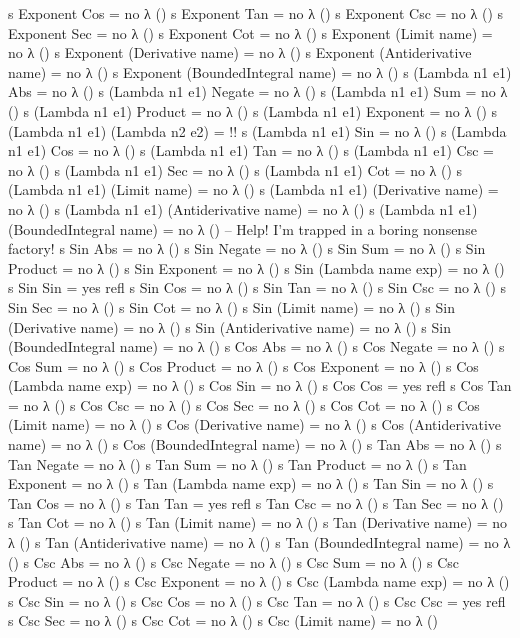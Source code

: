 \documentclass{report}
\begin{document}
\begin{code}
  s Exponent Cos = no λ ()
  s Exponent Tan = no λ ()
  s Exponent Csc = no λ ()
  s Exponent Sec = no λ ()
  s Exponent Cot = no λ ()
  s Exponent (Limit name) = no λ ()
  s Exponent (Derivative name) = no λ ()
  s Exponent (Antiderivative name) = no λ ()
  s Exponent (BoundedIntegral name) = no λ ()
  s (Lambda n1 e1) Abs = no λ ()
  s (Lambda n1 e1) Negate = no λ ()
  s (Lambda n1 e1) Sum = no λ ()
  s (Lambda n1 e1) Product = no λ ()
  s (Lambda n1 e1) Exponent = no λ ()
  s (Lambda n1 e1) (Lambda n2 e2) = {!!}
  s (Lambda n1 e1) Sin = no λ ()
  s (Lambda n1 e1) Cos = no λ ()
  s (Lambda n1 e1) Tan = no λ ()
  s (Lambda n1 e1) Csc = no λ ()
  s (Lambda n1 e1) Sec = no λ ()
  s (Lambda n1 e1) Cot = no λ ()
  s (Lambda n1 e1) (Limit name) = no λ ()
  s (Lambda n1 e1) (Derivative name) = no λ ()
  s (Lambda n1 e1) (Antiderivative name) = no λ ()
  s (Lambda n1 e1) (BoundedIntegral name) = no λ ()
  -- Help!  I'm trapped in a boring nonsense factory!
  s Sin Abs = no λ ()
  s Sin Negate = no λ ()
  s Sin Sum = no λ ()
  s Sin Product = no λ ()
  s Sin Exponent = no λ ()
  s Sin (Lambda name exp) = no λ ()
  s Sin Sin = yes refl
  s Sin Cos = no λ ()
  s Sin Tan = no λ ()
  s Sin Csc = no λ ()
  s Sin Sec = no λ ()
  s Sin Cot = no λ ()
  s Sin (Limit name) = no λ ()
  s Sin (Derivative name) = no λ ()
  s Sin (Antiderivative name) = no λ ()
  s Sin (BoundedIntegral name) = no λ ()
  s Cos Abs = no λ ()
  s Cos Negate = no λ ()
  s Cos Sum = no λ ()
  s Cos Product = no λ ()
  s Cos Exponent = no λ ()
  s Cos (Lambda name exp) = no λ ()
  s Cos Sin = no λ ()
  s Cos Cos = yes refl
  s Cos Tan = no λ ()
  s Cos Csc = no λ ()
  s Cos Sec = no λ ()
  s Cos Cot = no λ ()
  s Cos (Limit name) = no λ ()
  s Cos (Derivative name) = no λ ()
  s Cos (Antiderivative name) = no λ ()
  s Cos (BoundedIntegral name) = no λ ()
  s Tan Abs = no λ ()
  s Tan Negate = no λ ()
  s Tan Sum = no λ ()
  s Tan Product = no λ ()
  s Tan Exponent = no λ ()
  s Tan (Lambda name exp) = no λ ()
  s Tan Sin = no λ ()
  s Tan Cos = no λ ()
  s Tan Tan = yes refl
  s Tan Csc = no λ ()
  s Tan Sec = no λ ()
  s Tan Cot = no λ ()
  s Tan (Limit name) = no λ ()
  s Tan (Derivative name) = no λ ()
  s Tan (Antiderivative name) = no λ ()
  s Tan (BoundedIntegral name) = no λ ()
  s Csc Abs = no λ ()
  s Csc Negate = no λ ()
  s Csc Sum = no λ ()
  s Csc Product = no λ ()
  s Csc Exponent = no λ ()
  s Csc (Lambda name exp) = no λ ()
  s Csc Sin = no λ ()
  s Csc Cos = no λ ()
  s Csc Tan = no λ ()
  s Csc Csc = yes refl
  s Csc Sec = no λ ()
  s Csc Cot = no λ ()
  s Csc (Limit name) = no λ ()

\end{code}
\end{document}
